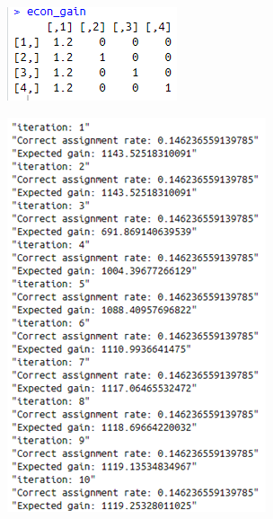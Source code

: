 \documentclass{article}
\begin{document}
\begin{multicols}{2}
\begin{enumerate}
    \includegraphics{fig13.png} 

    \includegraphics{fig14.png}
    
\end{enumerate}
\end{multicols}
\end{document}
